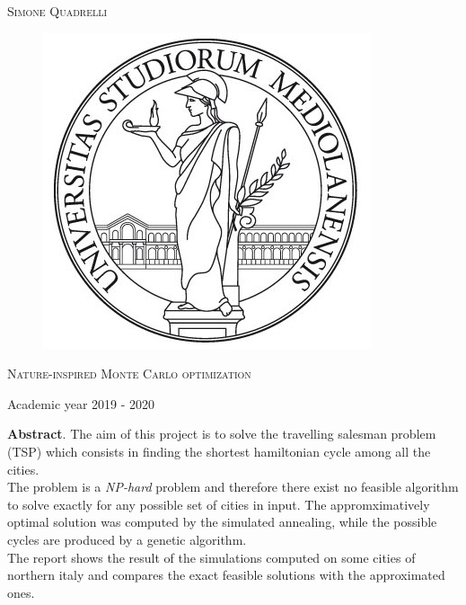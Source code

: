 \documentclass{article}
\begin{document}
\begin{titlepage}
	
	
	\begin{center}
		\vspace{2 cm}
		{\Large \textsc{Simone Quadrelli} }
	\end{center}
	
	
	\begin{figure}[H]
		\vspace{2 cm}
		\centering
		\includegraphics[width=0.30\linewidth]{tesiSCIENZE_TECNOLOGIE.jpg}
		
	\end{figure}
	
	\begin{center}
		\vspace{2 cm}
		{\Large \textsc{Nature-inspired Monte Carlo optimization} }
	\end{center}

	\par
	\vspace{3 cm}
	
	\begin{center}
		{\large Academic year 2019 - 2020}
	\end{center}
\end{titlepage}

\newpage 
{}
\tableofcontents
\listoftables
\listoffigures
\newpage

\noindent \textbf{Abstract}. The aim of this project is to solve the travelling salesman problem (TSP) which consists in finding the shortest hamiltonian cycle among all the cities.\\
The problem is a \textit{NP-hard} problem and therefore there exist no feasible algorithm to solve exactly for any possible set of cities in input. The appromximatively optimal solution was computed by the simulated annealing, while the possible cycles are produced by a genetic algorithm.\\
The report shows the result of the simulations computed on some cities of northern italy and compares the exact feasible solutions with the approximated ones.
\end{document}
